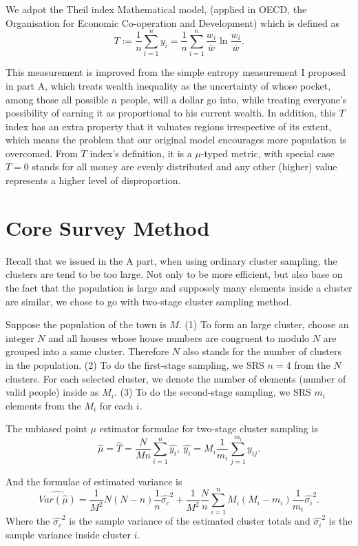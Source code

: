 \documentclass[12pt]{article}%
\begin{document}
We adpot the Theil index Mathematical model, (applied in OECD, 
the Organisation for Economic Co-operation and Development) 
which is defined as 
$$T:=\frac{1}{n}\sum_{i=1}^{n}y_i
=\frac{1}{n}\sum_{i=1}^n \frac{w_i}{\bar{w}}\ln{ \frac{w_i}{\bar{w}} }.$$

This measurement is improved 
from the simple entropy measurement I proposed in part A, 
which treats wealth inequality as the uncertainty of 
whose pocket, among those all possible $n$ people, will a dollar go into, 
while treating everyone's possibility of earning it as 
proportional to his current wealth. 
In addition, this $T$ index has an extra property that 
it valuates regions irrespective of its extent, 
which means the problem that 
our original model encourages more population is overcomed.
From $T$ index's definition, it is a $\mu$-typed metric, with special case 
$T=0$ stands for all money are evenly distributed 
and any other (higher) value represents a higher level of disproportion.

\section{Core Survey Method}
Recall that we issued in the A part, 
when using ordinary cluster sampling, 
the clusters are tend to be too large. 
Not only to be more efficient, but also
base on the fact that the population is large and supposely many elements
inside a cluster are similar, 
we chose to go with two-stage cluster sampling method.

Suppose the population of the town is $M.$
(1) To form an large cluster, choose an integer $N$ 
and all houses whose house numbers are congruent to modulo $N$
are grouped into a same cluster. 
Therefore $N$ also stands for the number of clusters in the population. 
(2) To do the first-stage sampling, we SRS $n=4$ from the $N$ clusters. 
For each selected cluster,
we denote the number of elements (number of valid people) inside as $M_i$.
(3) To do the second-stage sampling, 
we SRS $m_i$ elements from the $M_i$ for each $i$.

The unbiased point $\mu$ estimator formulae for two-stage cluster sampling is 
$$\hat{\mu}=\hat{T}=\frac{N}{Mn} \sum_{i=1}^n \hat{y_i},~
\hat{y_i}=M_i\frac{1}{m_i} \sum_{j=1}^{m_i}y_{ij}.$$

And the formulae of estimated variance is 
$$\widehat{Var(\hat{\mu})} = 
\frac{1}{M^2}N(N-n)\frac{1}{n}\hat{\sigma_c}^2
+\frac{1}{M^2}\frac{N}{n}\sum_{i=1}^{n}M_i(M_i-m_i)\frac{1}{m_i}\hat{\sigma_i}^2.$$ 
Where the $\hat{\sigma_c}^2$ is the sample variance of the estimated cluster
totals and $\hat{\sigma_i}^2$ is the sample variance inside cluster $i$.
\end{document}

